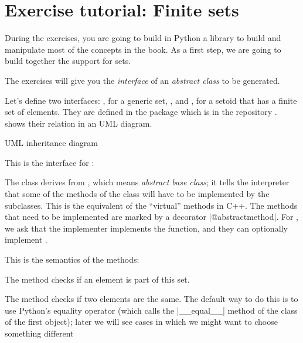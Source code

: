 

\section{Exercise tutorial: Finite sets}\label{sec:exercise-tutorial}


During the exercises, you are going to build in Python a library to build and manipulate most of the concepts in the book.
As a first step, we are going to build together the support for sets.

The exercises will give you the \emph{interface} of an \emph{abstract class} to be generated.

Let's define two interfaces: \Setoid, for a generic set, \EnumerableSet, and \FiniteSet, for a setoid that has a finite set of elements.
They are defined in the package  which is in the repository .
 shows their relation in an UML diagram.

\begin{marginfigure}

  \caption{UML inheritance diagram}
  \label{fig:Setoid-inheritance}
\end{marginfigure}

This is the interface for \Setoid:

\begin{widepar}
\end{widepar}

The class \Setoid  derives from , which means \emph{abstract base class}; it tells the interpreter that some of the methods of the class will have to be implemented by the subclasses.
This is the equivalent of the ``virtual'' methods in C++.
The methods that need to be implemented are marked by a decorator \pystr|@abstractmethod|.
For \Setoid, we ask that the implementer implements the  function, and they can optionally implement .

This is the semantics of the methods:

\begin{compactitem}
  \item The method  checks if an element is part of this set.
  \item The method  checks if two elements are the same.
  The default way to do this is to use Python's equality operator (which calls the \pystr|__equal__| method of the class of the first object); later we will see cases in which we might want to choose something different
\end{compactitem}


